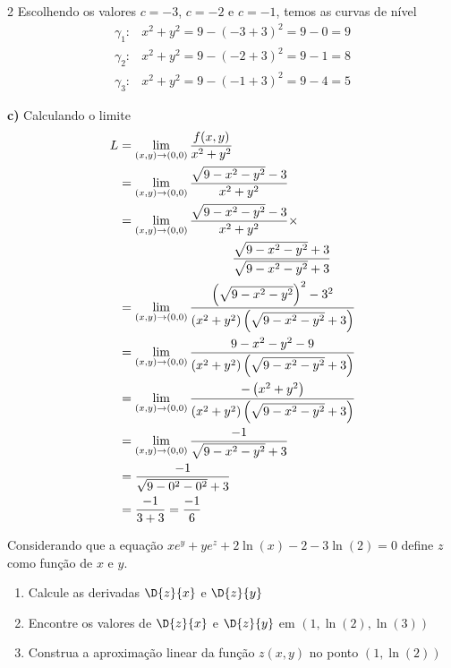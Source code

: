 \documentclass[a4paper,12pt,fleqn]{article}
\begin{document}
\begin{answer}
\begin{multicols*}{2}
Escolhendo os valores $c=-3$, $c=-2$ e $c=-1$, temos as curvas de nível
\begin{align*}
  \gamma_1\colon & x^2 + y^2 = 9 - (-3 + 3)^2 = 9 - 0 = 9 \\
  \gamma_2\colon & x^2 + y^2 = 9 - (-2 + 3)^2 = 9 - 1 = 8 \\
  \gamma_3\colon & x^2 + y^2 = 9 - (-1 + 3)^2 = 9 - 4 = 5
\end{align*}

\vspace{\baselineskip}
\textbf{c)\;}
Calculando o limite
\setlength{\jot}{12pt}
\setlength{\mathindent}{0cm}
\begin{align*}
  L
  & = \lim_{(x, y)\to(0, 0)} \frac{f(x, y)}{x^2+y^2} \\
  & = \lim_{(x, y)\to(0, 0)} \frac{\sqrt{9-x^2-y^2}-3}{x^2+y^2} \\
  & = \lim_{(x, y)\to(0, 0)} \frac{\sqrt{9-x^2-y^2}-3}{x^2+y^2} \times \\
  & \hspace{32mm}            \frac{\sqrt{9-x^2-y^2}+3}{\sqrt{9-x^2-y^2}+3} \\
  & = \lim_{(x, y)\to(0, 0)} \frac{\left(\sqrt{9-x^2-y^2}\right)^2-3^2}
                                  {\left(x^2+y^2\right)\left(\sqrt{9-x^2-y^2}+3\right)} \\
  & = \lim_{(x, y)\to(0, 0)} \frac{9-x^2-y^2-9}{\left(x^2+y^2\right)\left(\sqrt{9-x^2-y^2}+3\right)} \\
  & = \lim_{(x, y)\to(0, 0)} \frac{-\left(x^2+y^2\right)}{\left(x^2+y^2\right)\left(\sqrt{9-x^2-y^2}+3\right)}\\
  & = \lim_{(x, y)\to(0, 0)} \frac{-1}{\sqrt{9-x^2-y^2}+3} \\
  & = \frac{-1}{\sqrt{9-0^2-0^2}+3} \\
  & = \frac{-1}{3 + 3} = \frac{-1}{6}
\end{align*}
\end{multicols*}
\end{answer}

Considerando que a equação
\(
  xe^y + ye^z + 2\ln(x) -2 -3\ln(2) = 0
\)
define $z$ como função de $x$ e $y$.
\begin{enumerate}[label=\alph*)]
  \item Calcule as derivadas \(\D{z}{x}\) e \(\D{z}{y}\)
  \item Encontre os valores de \(\D{z}{x}\) e \(\D{z}{y}\) em \((1, \ln(2), \ln(3))\)
  \item Construa a aproximação linear da função $z(x, y)$ no ponto \((1, \ln(2))\)
\end{enumerate}
\clearpagequestiononly
\end{document}
